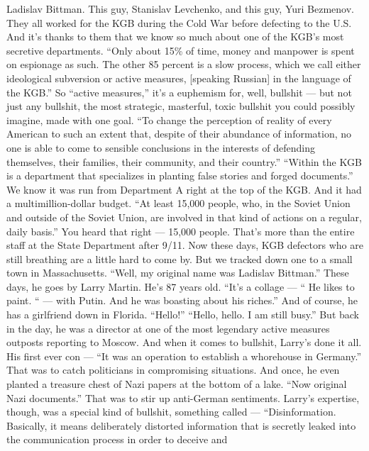 \begin{itemize}
  Ladislav Bittman. This guy, Stanislav Levchenko, and this guy, Yuri
  Bezmenov. They all worked for the KGB during the Cold War before
  defecting to the U.S. And it's thanks to them that we know so much
  about one of the KGB's most secretive departments. ``Only about 15\%
  of time, money and manpower is spent on espionage as such. The other
  85 percent is a slow process, which we call either ideological
  subversion or active measures, {[}speaking Russian{]} in the language
  of the KGB.'' So ``active measures,'' it's a euphemism for, well,
  bullshit --- but not just any bullshit, the most strategic, masterful,
  toxic bullshit you could possibly imagine, made with one goal. ``To
  change the perception of reality of every American to such an extent
  that, despite of their abundance of information, no one is able to
  come to sensible conclusions in the interests of defending themselves,
  their families, their community, and their country.'' ``Within the KGB
  is a department that specializes in planting false stories and forged
  documents.'' We know it was run from Department A right at the top of
  the KGB. And it had a multimillion-dollar budget. ``At least 15,000
  people, who, in the Soviet Union and outside of the Soviet Union, are
  involved in that kind of actions on a regular, daily basis.'' You
  heard that right --- 15,000 people. That's more than the entire staff
  at the State Department after 9/11. Now these days, KGB defectors who
  are still breathing are a little hard to come by. But we tracked down
  one to a small town in Massachusetts. ``Well, my original name was
  Ladislav Bittman.'' These days, he goes by Larry Martin. He's 87 years
  old. ``It's a collage --- `` He likes to paint. `` --- with Putin. And
  he was boasting about his riches.'' And of course, he has a girlfriend
  down in Florida. ``Hello!'' ``Hello, hello. I am still busy.'' But
  back in the day, he was a director at one of the most legendary active
  measures outposts reporting to Moscow. And when it comes to bullshit,
  Larry's done it all. His first ever con --- ``It was an operation to
  establish a whorehouse in Germany.'' That was to catch politicians in
  compromising situations. And once, he even planted a treasure chest of
  Nazi papers at the bottom of a lake. ``Now original Nazi documents.''
  That was to stir up anti-German sentiments. Larry's expertise, though,
  was a special kind of bullshit, something called --- ``Disinformation.
  Basically, it means deliberately distorted information that is
  secretly leaked into the communication process in order to deceive and

\end{itemize}
